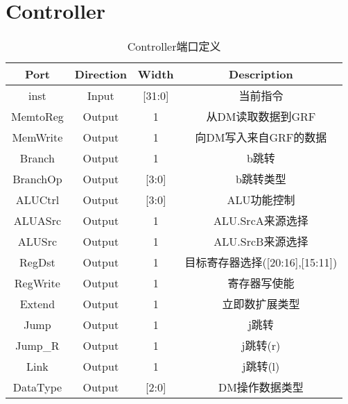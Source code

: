 \documentclass[UTF8]{ctexart}
\begin{document}
\section{Controller}
\begin{table}[H]
	\centering
	\begin{threeparttable}
		\caption{Controller端口定义}
		\begin{tabular}{cccc}
			\toprule
			\rowcolor{mypink}
			\textbf{Port} & \textbf{Direction} & \textbf{Width} & \textbf{Description}            \\
			\midrule
			inst          & Input              & [31:0]         & 当前指令                        \\
			\midrule
			MemtoReg      & Output             & 1              & 从DM读取数据到GRF               \\
			\midrule
			MemWrite      & Output             & 1              & 向DM写入来自GRF的数据           \\
			\midrule
			Branch        & Output             & 1              & b跳转                           \\
			\midrule
			BranchOp      & Output             & [3:0]          & b跳转类型                       \\
			\midrule
			ALUCtrl       & Output             & [3:0]          & ALU功能控制                     \\
			\midrule
			ALUASrc       & Output             & 1              & ALU.SrcA来源选择                \\
			\midrule
			ALUSrc        & Output             & 1              & ALU.SrcB来源选择                \\
			\midrule
			RegDst        & Output             & 1              & 目标寄存器选择([20:16],[15:11]) \\
			\midrule
			RegWrite      & Output             & 1              & 寄存器写使能                    \\
			\midrule
			Extend        & Output             & 1              & 立即数扩展类型                  \\
			\midrule
			Jump          & Output             & 1              & j跳转                           \\
			\midrule
			Jump\_R       & Output             & 1              & j跳转(r)                        \\
			\midrule
			Link          & Output             & 1              & j跳转(l)                        \\
			\midrule
			DataType      & Output             & [2:0]          & DM操作数据类型                  \\
			\midrule
		\end{tabular}
	\end{threeparttable}
\end{table}
\end{document}
